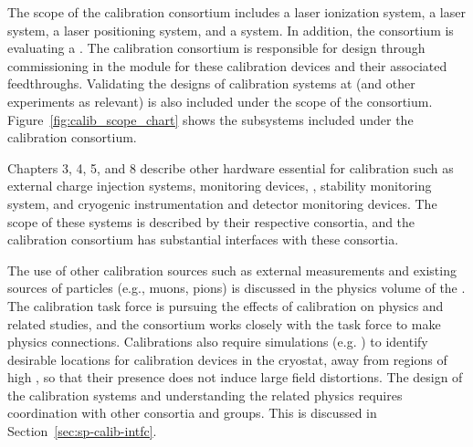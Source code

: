 
The scope of the calibration consortium includes a laser ionization system, a \phel laser system, a laser positioning system, and a 
system. In addition, the consortium is evaluating a .
 The calibration consortium is responsible for design through commissioning in the  module for these calibration devices and their associated feedthroughs. Validating the designs of calibration systems at  (and other experiments as relevant) is also included under the scope of the consortium. Figure~\ref{fig:calib_scope_chart} shows the subsystems included under the calibration consortium. 

Chapters 3, 4, 5, and 8  describe other hardware essential for calibration such as  external charge injection systems,  monitoring devices, ,
stability monitoring system, and cryogenic instrumentation and detector monitoring devices. The scope of these systems is described by their respective consortia, and the calibration consortium has substantial interfaces with these consortia. 

The use of other calibration sources such as external measurements and existing sources of particles (e.g., muons, pions) is discussed in the physics volume of the . The calibration task force is pursuing the effects of calibration on physics and related studies, and the consortium works closely with the task force to make physics connections. Calibrations also require simulations (e.g. \efield) to identify desirable locations for calibration devices in the cryostat, away from regions of high \efield, so that their presence does not induce large field distortions. 
The design of the calibration systems and understanding the related physics requires coordination with other consortia and groups. This is discussed in Section~\ref{sec:sp-calib-intfc}.


